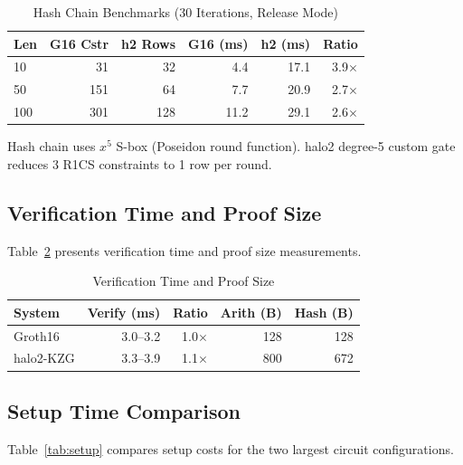 \begin{table}[htbp]
\caption{Hash Chain Benchmarks (30 Iterations, Release Mode)}
\label{tab:bench-hash}
\centering
\begin{tabular}{@{}lrrrrr@{}}
\toprule
\textbf{Len} & \textbf{G16 Cstr} & \textbf{h2 Rows} & \textbf{G16 (ms)} & \textbf{h2 (ms)} & \textbf{Ratio} \\
\midrule
10  & 31  & 32  & 4.4  & 17.1 & 3.9$\times$ \\
50  & 151 & 64  & 7.7  & 20.9 & 2.7$\times$ \\
100 & 301 & 128 & 11.2 & 29.1 & 2.6$\times$ \\
\bottomrule
\end{tabular}
\begin{flushleft}
\footnotesize Hash chain uses $x^5$ S-box (Poseidon round function).
halo2 degree-5 custom gate reduces 3 R1CS constraints to 1 row per round.
\end{flushleft}
\end{table}

\subsection{Verification Time and Proof Size}

Table~\ref{tab:verify-proof} presents verification time and proof
size measurements.

\begin{table}[htbp]
\caption{Verification Time and Proof Size}
\label{tab:verify-proof}
\centering
\begin{tabular}{@{}lrrrr@{}}
\toprule
\textbf{System} & \textbf{Verify (ms)} & \textbf{Ratio} & \textbf{Arith (B)} & \textbf{Hash (B)} \\
\midrule
Groth16    & 3.0--3.2 & 1.0$\times$ & 128 & 128 \\
halo2-KZG  & 3.3--3.9 & 1.1$\times$ & 800 & 672 \\
\bottomrule
\end{tabular}
\end{table}

\subsection{Setup Time Comparison}

Table~\ref{tab:setup} compares setup costs for the two largest
circuit configurations.

